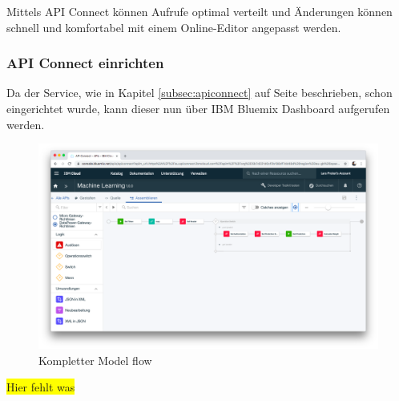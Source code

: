 Mittels API Connect können Aufrufe optimal verteilt und Änderungen können schnell und komfortabel mit einem Online-Editor
angepasst werden.

\subsubsection{API Connect einrichten}
Da der Service, wie in Kapitel \ref{subsec:apiconnect} auf Seite \pageref{subsec:apiconnect} beschrieben, schon
eingerichtet wurde, kann dieser nun über IBM Bluemix Dashboard aufgerufen werden.

\begin{figure}[h]
\centering
\includegraphics[scale=0.26]{images/kapitel_3/api_connect.png}
\caption{Kompletter Model flow}
\label{fig:umsetzung_model_flow}
\end{figure}

\colorbox{yellow}{Hier fehlt was}